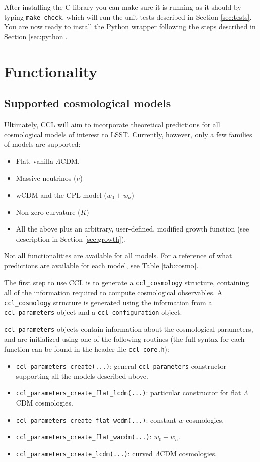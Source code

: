 \documentclass[\docopts]{\docclass}
\begin{document}
After installing the C library you can make sure it is running as it should by typing {\tt make check}, which will run the unit tests described in Section \ref{sec:tests}. You are now ready to install the Python wrapper following the steps described in Section \ref{sec:python}.

\section{Functionality}
\label{sec:func}

\subsection{Supported cosmological models}
\label{sec:cosmologies}
Ultimately, CCL will aim to incorporate theoretical predictions for all cosmological models of interest to LSST. Currently, however, only a few families of models are supported:
\begin{itemize}
 \item Flat, vanilla $\Lambda$CDM.
 \item Massive neutrinos ($\nu$)
 \item wCDM and the CPL model ($w_0+w_a$)
 \item Non-zero curvature ($K$)
 \item All the above plus an arbitrary, user-defined, modified growth function (see description in Section \ref{sec:growth}).
\end{itemize}

Not all functionalities are available for all models. For a reference of what 
predictions are available for each model, see Table \ref{tab:cosmo}.

The first step to use CCL is to generate a {\tt ccl\_cosmology} structure, containing all of the information required to compute cosmological observables. A {\tt ccl\_cosmology} structure is generated using the information from a {\tt ccl\_parameters} object and a {\tt ccl\_configuration} object. 



{\tt ccl\_parameters} objects contain information about the cosmological parameters, and are initialized using one of the following routines (the full syntax for each function can be found in the header file {\tt ccl\_core.h}):
\begin{itemize}
 \item {\tt ccl\_parameters\_create(...)}: general {\tt ccl\_parameters} constructor supporting all the models described above.
 \item {\tt ccl\_parameters\_create\_flat\_lcdm(...)}: particular constructor for flat $\Lambda$CDM cosmologies.
 \item {\tt ccl\_parameters\_create\_flat\_wcdm(...)}: constant $w$ cosmologies.
 \item {\tt ccl\_parameters\_create\_flat\_wacdm(...)}: $w_0+w_a$.
 \item {\tt ccl\_parameters\_create\_lcdm(...)}: curved $\Lambda$CDM cosmologies.
\end{itemize}
\end{document}
